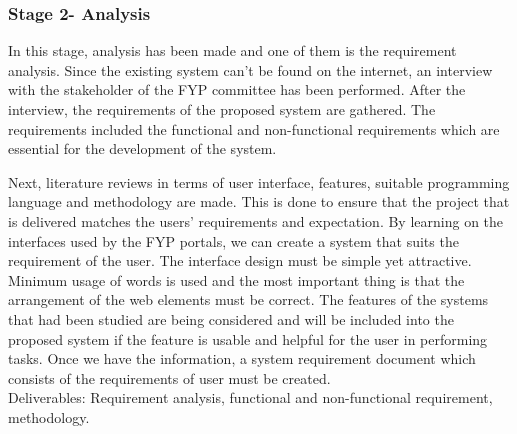 \documentclass{article}
\begin{document}
\subsubsection{Stage 2- Analysis}
\par In this stage, analysis has been made and one of them is the requirement analysis. Since
the existing system can’t be found on the internet, an interview with the stakeholder of the FYP
committee has been performed. After the interview, the requirements of the proposed system are
gathered. The requirements included the functional and non-functional requirements which are
essential for the development of the system.
\par Next, literature reviews in terms of user interface, features, suitable programming
language and methodology are made. This is done to ensure that the project that is delivered
matches the users’ requirements and expectation. By learning on the interfaces used by the FYP
portals, we can create a system that suits the requirement of the user. The interface design must
be simple yet attractive. Minimum usage of words is used and the most important thing is that
the arrangement of the web elements must be correct. The features of the systems that had been
studied are being considered and will be included into the proposed system if the feature is
usable and helpful for the user in performing tasks. Once we have the information, a system
requirement document which consists of the requirements of user must be created.\\
Deliverables: Requirement analysis, functional and non-functional requirement, methodology.
\end{document}
